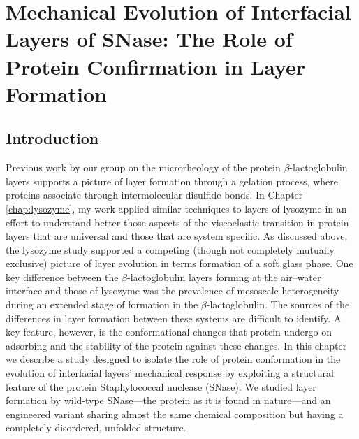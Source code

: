 \chapter{\label{chap:snase}Mechanical Evolution of Interfacial Layers of SNase: The Role of Protein Confirmation in Layer Formation}

\section{Introduction}

Previous work by our group on the microrheology of the protein $\beta$-lactoglobulin layers\cite{Lee2010} supports a picture of layer formation through a gelation process, where proteins associate through intermolecular disulfide bonds. In Chapter \ref{chap:lysozyme}, my work applied similar techniques to layers of lysozyme in an effort to understand better those aspects of the viscoelastic transition in protein layers that are universal and those that are system specific. As discussed above, the lysozyme study supported a competing (though not completely mutually exclusive) picture of layer evolution in terms formation of a soft glass phase. One key difference between the $\beta$-lactoglobulin layers forming at the air--water interface and those of lysozyme was the prevalence of mesoscale heterogeneity during an extended stage of formation in the $\beta$-lactoglobulin. The sources of the differences in layer formation between these systems are difficult to identify. A key feature, however, is the conformational changes that protein undergo on adsorbing and the stability of the protein against these changes. In this chapter we describe a study designed to isolate the role of protein conformation in the evolution of interfacial layers' mechanical response by exploiting a structural feature of the protein Staphylococcal nuclease (SNase). We studied layer formation by wild-type SNase---the protein as it is found in nature---and an engineered variant sharing almost the same chemical composition but having a completely disordered, unfolded structure.

